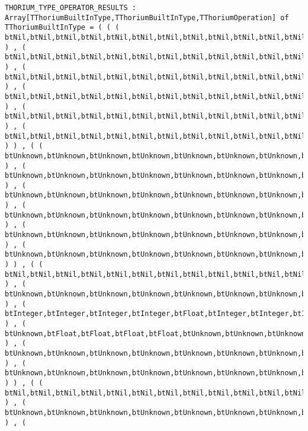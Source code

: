 \begin{verbatim}
THORIUM_TYPE_OPERATOR_RESULTS : Array[TThoriumBuiltInType,TThoriumBuiltInType,TThoriumOperation] of TThoriumBuiltInType = ( ( ( btNil,btNil,btNil,btNil,btNil,btNil,btNil,btNil,btNil,btNil,btNil,btNil,btNil,btNil,btNil,btNil,btNil ) , ( btNil,btNil,btNil,btNil,btNil,btNil,btNil,btNil,btNil,btNil,btNil,btNil,btNil,btNil,btNil,btNil,btNil ) , ( btNil,btNil,btNil,btNil,btNil,btNil,btNil,btNil,btNil,btNil,btNil,btNil,btNil,btNil,btNil,btNil,btNil ) , ( btNil,btNil,btNil,btNil,btNil,btNil,btNil,btNil,btNil,btNil,btNil,btNil,btNil,btNil,btNil,btNil,btNil ) , ( btNil,btNil,btNil,btNil,btNil,btNil,btNil,btNil,btNil,btNil,btNil,btNil,btNil,btNil,btNil,btNil,btNil ) , ( btNil,btNil,btNil,btNil,btNil,btNil,btNil,btNil,btNil,btNil,btNil,btNil,btNil,btNil,btNil,btNil,btNil ) ) , ( ( btUnknown,btUnknown,btUnknown,btUnknown,btUnknown,btUnknown,btUnknown,btUnknown,btUnknown,btUnknown,btUnknown,btUnknown,btUnknown,btUnknown,btUnknown,btUnknown,btUnknown ) , ( btUnknown,btUnknown,btUnknown,btUnknown,btUnknown,btUnknown,btUnknown,btUnknown,btUnknown,btUnknown,btUnknown,btUnknown,btUnknown,btUnknown,btUnknown,btUnknown,btUnknown ) , ( btUnknown,btUnknown,btUnknown,btUnknown,btUnknown,btUnknown,btUnknown,btUnknown,btUnknown,btUnknown,btUnknown,btUnknown,btUnknown,btUnknown,btUnknown,btUnknown,btUnknown ) , ( btUnknown,btUnknown,btUnknown,btUnknown,btUnknown,btUnknown,btUnknown,btUnknown,btUnknown,btUnknown,btUnknown,btUnknown,btUnknown,btUnknown,btUnknown,btUnknown,btUnknown ) , ( btUnknown,btUnknown,btUnknown,btUnknown,btUnknown,btUnknown,btUnknown,btUnknown,btUnknown,btUnknown,btUnknown,btUnknown,btUnknown,btUnknown,btUnknown,btUnknown,btUnknown ) , ( btUnknown,btUnknown,btUnknown,btUnknown,btUnknown,btUnknown,btUnknown,btUnknown,btUnknown,btUnknown,btUnknown,btUnknown,btUnknown,btUnknown,btUnknown,btUnknown,btUnknown ) ) , ( ( btNil,btNil,btNil,btNil,btNil,btNil,btNil,btNil,btNil,btNil,btNil,btNil,btNil,btNil,btNil,btNil,btNil ) , ( btUnknown,btUnknown,btUnknown,btUnknown,btUnknown,btUnknown,btUnknown,btUnknown,btUnknown,btUnknown,btUnknown,btUnknown,btUnknown,btUnknown,btUnknown,btUnknown,btUnknown ) , ( btInteger,btInteger,btInteger,btInteger,btFloat,btInteger,btInteger,btInteger,btInteger,btInteger,btInteger,btInteger,btInteger,btInteger,btInteger,btInteger,btInteger ) , ( btUnknown,btFloat,btFloat,btFloat,btFloat,btUnknown,btUnknown,btUnknown,btUnknown,btUnknown,btUnknown,btUnknown,btUnknown,btUnknown,btUnknown,btInteger,btUnknown ) , ( btUnknown,btUnknown,btUnknown,btUnknown,btUnknown,btUnknown,btUnknown,btUnknown,btUnknown,btUnknown,btUnknown,btUnknown,btUnknown,btUnknown,btUnknown,btUnknown,btUnknown ) , ( btUnknown,btUnknown,btUnknown,btUnknown,btUnknown,btUnknown,btUnknown,btUnknown,btUnknown,btUnknown,btUnknown,btUnknown,btUnknown,btUnknown,btUnknown,btUnknown,btUnknown ) ) , ( ( btNil,btNil,btNil,btNil,btNil,btNil,btNil,btNil,btNil,btNil,btNil,btNil,btNil,btNil,btNil,btNil,btNil ) , ( btUnknown,btUnknown,btUnknown,btUnknown,btUnknown,btUnknown,btUnknown,btUnknown,btUnknown,btUnknown,btUnknown,btUnknown,btUnknown,btUnknown,btUnknown,btUnknown,btUnknown ) , ( 
\end{verbatim}
